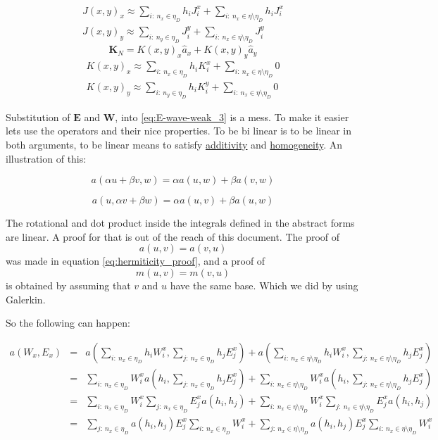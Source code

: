 \begin{align*}
J(x,y)_x\approx \sum_{i:\ n_x \in \eta_D}h_i J_i^x+\sum_{i:\ n_x \in \eta\setminus\eta_D}h_i J_i^x \\
J(x,y)_y\approx \sum_{i:\ n_y \in \eta_D}J_i^y+
\sum_{i:\ n_x \in \eta\setminus\eta_D}J_i^y
\end{align*}
$$\mathbf{K}_N=K(x,y)_x\hat{a}_x + K(x,y)_y \hat{a}_y $$
\begin{align*}
K(x,y)_x\approx \sum_{i:\ n_x \in \eta_D}h_i K_i^x+\sum_{i:\ n_x \in \eta\setminus\eta_D} 0 \\
K(x,y)_y\approx \sum_{i:\ n_y \in \eta_D}h_i K_i^y+
\sum_{i:\ n_x \in \eta\setminus\eta_D} 0
\end{align*}

Substitution of $\mathbf{E}$ and $\mathbf{W}$, into \ref{eq:E-wave-weak_3} is a mess. To make it easier lets use the operators and their nice properties. To be bi linear is to be linear in both arguments, to be linear means to satisfy \href{http://en.wikipedia.org/wiki/Additive_function}{additivity} and \href{http://en.wikipedia.org/wiki/Homogeneous_function}{homogeneity}. An illustration of this:

$$a(\alpha u+\beta v, w)=\alpha a(u,w)+\beta a(v,w)$$

$$a(u,\alpha v+\beta w)=\alpha a(u,v)+\beta a(u,w)$$

The rotational and dot product inside the integrals defined in the abstract forms are linear. A proof for that is out of the reach of this document. 
The proof of
$$a(u,v) = a(v,u)$$
was made in equation \ref{eq:hermiticity_proof}, and a proof of
$$m(u,v) = m(v,u)$$
is obtained by assuming that $v$ and $u$ have the same base. Which we did by using Galerkin.

So the following can happen:

\begin{align}
a\left(W_x,E_x\right)&=& a\left( \sum_{i:\ n_x \in \eta_D} h_i W_i^x, \sum_{j:\ n_x \in \eta_D} h_j E_j^x\right)+a\left(\sum_{i:\ n_x \in \eta\setminus\eta_D} h_i W_i^x,\sum_{j:\ n_x \in \eta\setminus\eta_D} h_j E_j^x\right)\nonumber \\
&=&  \sum_{i:\ n_x \in \eta_D}W_i^x a\left(  h_i , \sum_{j:\ n_x \in \eta_D} h_j E_j^x\right)+\sum_{i:\ n_x \in \eta\setminus\eta_D} W_i^x a\left( h_i,\sum_{j:\ n_x \in \eta\setminus\eta_D} h_j E_j^x\right)\nonumber\\
&=&\sum_{i:\ n_x \in \eta_D}W_i^x \sum_{j:\ n_x \in \eta_D}E_j^x a\left(  h_i ,  h_j \right)+\sum_{i:\ n_x \in \eta\setminus\eta_D} W_i^x \sum_{j:\ n_x \in \eta\setminus\eta_D}  E_j^x a\left( h_i, h_j \right)\nonumber\\
&=& \sum_{j:\ n_x \in \eta_D} a\left(  h_i ,  h_j \right)E_j^x \sum_{i:\ n_x \in \eta_D}W_i^x+\sum_{j:\ n_x \in \eta\setminus\eta_D}   a\left( h_i, h_j \right)E_j^x\sum_{i:\ n_x \in \eta\setminus\eta_D} W_i^x \label{eq:substitution_of_app_fields_in_a}
\end{align}


